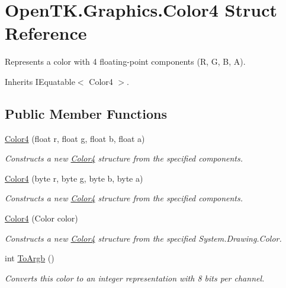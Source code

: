 \hypertarget{struct_open_t_k_1_1_graphics_1_1_color4}{\section{Open\-T\-K.\-Graphics.\-Color4 Struct Reference}
\label{struct_open_t_k_1_1_graphics_1_1_color4}
}


Represents a color with 4 floating-\/point components (R, G, B, A).  




Inherits I\-Equatable$<$ Color4 $>$.

\subsection*{Public Member Functions}
\begin{DoxyCompactItemize}
\item 
\hyperlink{struct_open_t_k_1_1_graphics_1_1_color4_a191ed2f3d886b678e77c362291e81d8b}{Color4} (float r, float g, float b, float a)
\begin{DoxyCompactList}\small\item\em Constructs a new \hyperlink{struct_open_t_k_1_1_graphics_1_1_color4}{Color4} structure from the specified components. \end{DoxyCompactList}\item 
\hyperlink{struct_open_t_k_1_1_graphics_1_1_color4_aacdb36aedfa8a51a6fa171866530332c}{Color4} (byte r, byte g, byte b, byte a)
\begin{DoxyCompactList}\small\item\em Constructs a new \hyperlink{struct_open_t_k_1_1_graphics_1_1_color4}{Color4} structure from the specified components. \end{DoxyCompactList}\item 
\hyperlink{struct_open_t_k_1_1_graphics_1_1_color4_ab0e1a4fce27877403bdbbbb57c9e24f5}{Color4} (Color color)
\begin{DoxyCompactList}\small\item\em Constructs a new \hyperlink{struct_open_t_k_1_1_graphics_1_1_color4}{Color4} structure from the specified System.\-Drawing.\-Color. \end{DoxyCompactList}\item 
int \hyperlink{struct_open_t_k_1_1_graphics_1_1_color4_a00b9aec9bdaeba8f3d3d52d638bafb03}{To\-Argb} ()
\begin{DoxyCompactList}\small\item\em Converts this color to an integer representation with 8 bits per channel. \end{DoxyCompactList}\item 

\end{DoxyCompactItemize}
